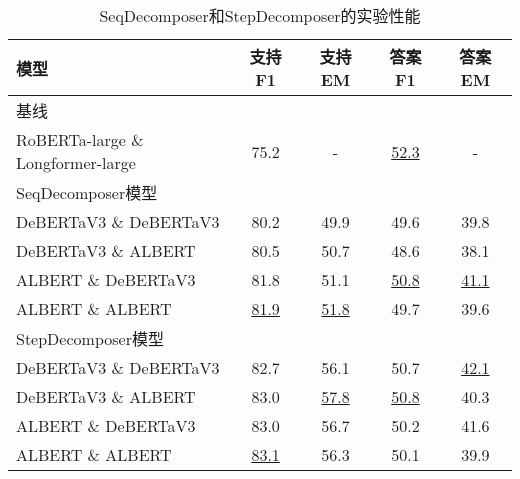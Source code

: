 \begin{table}[htbp]
    \centering
    \caption{SeqDecomposer和StepDecomposer的实验性能}
    \begin{tabular}{lcccc}
    \hline
    模型 & 支持 F1 & 支持 EM & 答案 F1 & 答案 EM \\
    \hline
    \multicolumn{5}{l}{基线} \\
    RoBERTa-large \& Longformer-large & 75.2 & - & \underline{52.3} & - \\
    \hline
    \multicolumn{5}{l}{SeqDecomposer模型} \\
    DeBERTaV3 \& DeBERTaV3 & 80.2 & 49.9 & 49.6 & 39.8 \\
    DeBERTaV3 \& ALBERT & 80.5 & 50.7 & 48.6 & 38.1 \\
    ALBERT \& DeBERTaV3 & 81.8 & 51.1 & \underline{50.8} & \underline{41.1} \\
    ALBERT \& ALBERT & \underline{81.9} & \underline{51.8} & 49.7 & 39.6 \\
    \hline
    \multicolumn{5}{l}{StepDecomposer模型} \\
    DeBERTaV3 \& DeBERTaV3 & 82.7 & 56.1 & 50.7 & \underline{42.1} \\
    DeBERTaV3 \& ALBERT & 83.0 & \underline{57.8} & \underline{50.8} & 40.3 \\
    ALBERT \& DeBERTaV3 & 83.0 & 56.7 & 50.2 & 41.6 \\
    ALBERT \& ALBERT & \underline{83.1} & 56.3 & 50.1 & 39.9 \\
    \hline
    \end{tabular}
    \label{tab:5-7}
\end{table}
